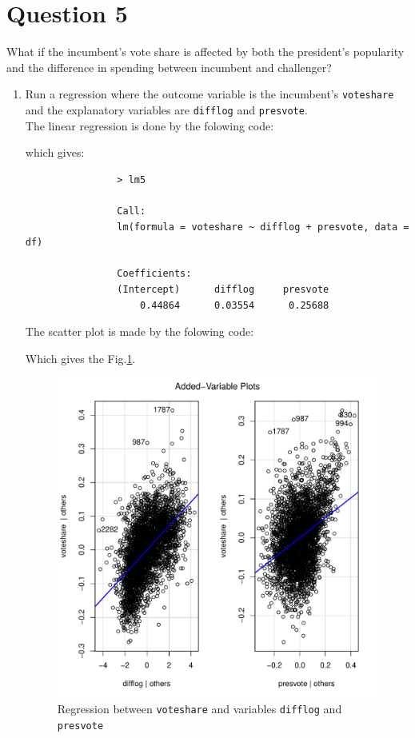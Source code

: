 \documentclass[12pt,letterpaper]{article}
\begin{document}
	\newpage	

\section*{Question 5}
\noindent What if the incumbent's vote share is affected by both the president's popularity and the difference in spending between incumbent and challenger? 
	\begin{enumerate}
		\item Run a regression where the outcome variable is the incumbent's \texttt{voteshare} and the explanatory variables are \texttt{difflog} and \texttt{presvote}. \\
		The linear regression is done by the folowing code:
			  
			which gives:
			\begin{verbatim}
				> lm5

				Call:
				lm(formula = voteshare ~ difflog + presvote, data = df)
				
				Coefficients:
				(Intercept)      difflog     presvote  
				    0.44864      0.03554      0.25688  
			\end{verbatim}	
			The scatter plot is made by the folowing code:
			  
			Which gives the Fig.\ref{fig:lm_5}. \\
				
			\begin{figure}[h!]\centering
				\caption{\footnotesize Regression between \texttt{voteshare} and  variables  \texttt{difflog} and \texttt{presvote}}
				\label{fig:lm_5}
				\includegraphics[width=.85\textwidth]{lm5.pdf}
			\end{figure}
			

\end{enumerate}
\end{document}

